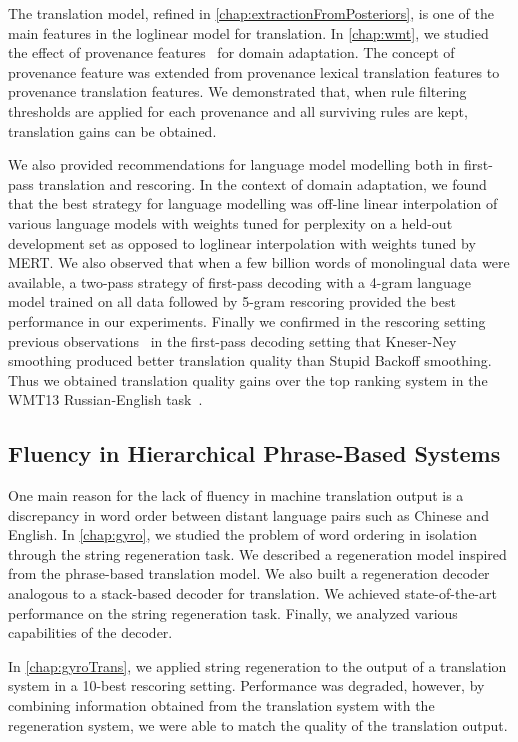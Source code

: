 The translation model, refined in \autoref{chap:extractionFromPosteriors},
is one of the main features in the loglinear model for translation.
In \autoref{chap:wmt}, we studied the effect of provenance
features~\citep{chiang-deneefe-pust:2011:ACL} for domain adaptation.
The concept of provenance feature was extended from provenance lexical translation
features to provenance translation features. We demonstrated that,
when rule filtering thresholds are applied for each provenance and all
surviving rules are kept, translation gains can be obtained.

We also provided recommendations for language model modelling both
in first-pass translation and rescoring. In the context of
domain adaptation, we found that the best strategy for language modelling
was off-line linear interpolation of various language models with
weights tuned for perplexity on a held-out development set as opposed
to loglinear interpolation with weights tuned by MERT.
We also observed that when a few billion words of monolingual data were
available, a two-pass strategy of first-pass decoding with a 4-gram
language model trained on all data followed by 5-gram rescoring
provided the best performance in our experiments.
Finally we confirmed in the rescoring setting previous
observations~\citep{brants-popat-xu-och-dean:2007:EMNLP-CoNLL} in
the first-pass decoding setting
that Kneser-Ney smoothing produced better translation quality than
Stupid Backoff smoothing. Thus we obtained translation quality gains
over the top ranking system in the WMT13 Russian-English
task~\citep{pino-waite-xiao-degispert-flego-byrne:2013:WMT}.

\subsection{Fluency in Hierarchical Phrase-Based Systems}

One main reason for the lack of fluency in machine translation
output is a discrepancy in word order between distant language pairs
such as Chinese and English. In \autoref{chap:gyro}, we
studied the problem of word ordering in isolation through
the string regeneration task. We described a regeneration
model inspired from the phrase-based translation model. We also
built a regeneration decoder
analogous to a stack-based decoder for translation.
We achieved state-of-the-art performance on the string regeneration
task. Finally, we analyzed various capabilities of the decoder.

In \autoref{chap:gyroTrans}, we applied string regeneration
to the output of a translation system in a 10-best rescoring setting.
Performance was degraded, however, by combining information obtained
from the translation system with the regeneration system, we were
able to match the quality of the translation output.

